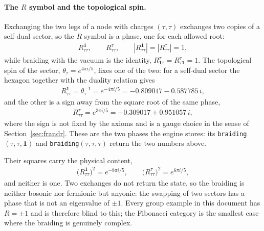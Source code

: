 \paragraph{The $R$ symbol and the topological spin.} Exchanging the two legs of a node
with charges $(\tau,\tau)$ exchanges two copies of a self-dual sector, so the $R$ symbol
is a phase, one for each allowed root:
\begin{align}
R^{\mathbf 1}_{\tau\tau},\qquad R^{\tau}_{\tau\tau},\qquad |R^{\mathbf 1}_{\tau\tau}|=|R^{\tau}_{\tau\tau}|=1 ,
\end{align}
while braiding with the vacuum is the identity, $R^{\tau}_{\mathbf 1\tau}=R^{\tau}_{\tau\mathbf 1}=1$.
The topological spin of the sector, $\theta_\tau=e^{4\pi i/5}$, fixes one of the two: for
a self-dual sector the hexagon together with the duality relation gives
\begin{align}
R^{\mathbf 1}_{\tau\tau}=\theta_\tau^{-1}=e^{-4\pi i/5}=-0.809017-0.587785\,i ,
\end{align}
and the other is a sign away from the square root of the same phase,
\begin{align}
R^{\tau}_{\tau\tau}=e^{3\pi i/5}=-0.309017+0.951057\,i ,
\end{align}
where the sign is not fixed by the axioms and is a gauge choice in the sense of
Section~\ref{sec:frandr}. These are the two phases the engine stores: its
\texttt{braiding}$(\tau,\tau,\mathbf 1)$ and \texttt{braiding}$(\tau,\tau,\tau)$ return
the two numbers above.

Their squares carry the physical content,
\begin{align}
\bigl(R^{\mathbf 1}_{\tau\tau}\bigr)^2=e^{-8\pi i/5},\qquad
\bigl(R^{\tau}_{\tau\tau}\bigr)^2=e^{6\pi i/5},
\end{align}
and neither is one. Two exchanges do not return the state, so the braiding is neither
bosonic nor fermionic but anyonic: the swapping of two sectors has a phase that is not
an eigenvalue of $\pm1$. Every group example in this document has $R=\pm1$ and is
therefore blind to this; the Fibonacci category is the smallest case where the braiding
is genuinely complex.

